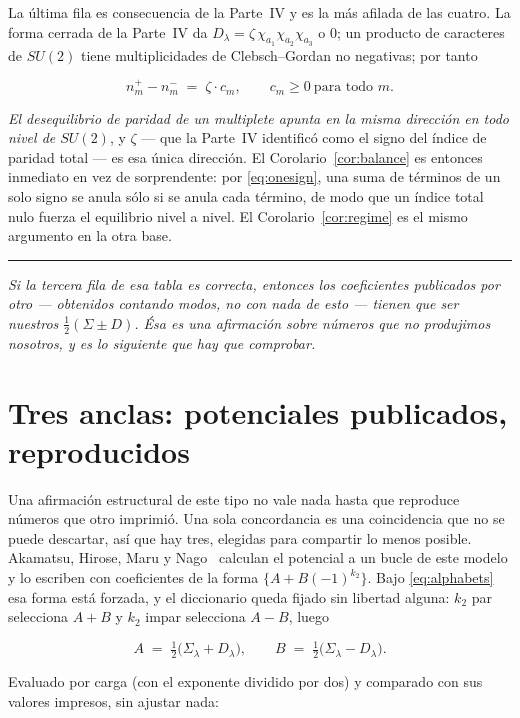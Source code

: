 \documentclass[11pt,a4paper]{article}
\newcommand{\Sig}{\Sigma_\lambda}
\newcommand{\Dl}{D_\lambda}
\newcommand{\bridge}[1]{\par\medskip\noindent
  \textcolor{hdrblue!45}{\rule{2.2cm}{0.6pt}}\;\;\parbox[t]{0.84\textwidth}{\small\itshape
  \textcolor{hdrblue!85}{#1}}\par\medskip}
\newenvironment{keyeq}
  {\begin{center}\setlength{\fboxsep}{9pt}\setlength{\fboxrule}{0.8pt}%
   \begin{lrbox}{\keyeqbox}\begin{minipage}{0.88\textwidth}}
  {\end{minipage}\end{lrbox}%
   \fcolorbox{hdrblue!55}{hdrblue!6}{\usebox{\keyeqbox}}\end{center}}
\begin{document}
La última fila es consecuencia de la Parte~IV y es la más afilada de las cuatro. La forma cerrada de
la Parte~IV da $\Dl=\zeta\,\chi_{a_1}\chi_{a_2}\chi_{a_3}$ o $0$; un producto de caracteres de $SU(2)$
tiene multiplicidades de Clebsch--Gordan no negativas; por tanto

\begin{keyeq}
\begin{equation}\label{eq:onesign}
n^+_m-n^-_m \;=\; \zeta\cdot c_m,\qquad c_m\ge0\ \text{para todo } m .
\end{equation}
\end{keyeq}

\noindent \emph{El desequilibrio de paridad de un multiplete apunta en la misma dirección en todo
nivel de $SU(2)$}, y $\zeta$ --- que la Parte~IV identificó como el signo del índice de paridad total
--- es esa única dirección. El Corolario~\ref{cor:balance} es entonces inmediato en vez de
sorprendente: por \eqref{eq:onesign}, una suma de términos de un solo signo se anula sólo si se anula
cada término, de modo que un índice total nulo fuerza el equilibrio nivel a nivel. El
Corolario~\ref{cor:regime} es el mismo argumento en la otra base.

\bridge{Si la tercera fila de esa tabla es correcta, entonces los coeficientes publicados por otro
--- obtenidos contando modos, no con nada de esto --- tienen que \emph{ser} nuestros
$\tfrac12(\Sigma\pm D)$. Ésa es una afirmación sobre números que no produjimos nosotros, y es lo
siguiente que hay que comprobar.}

\section{Tres anclas: potenciales publicados, reproducidos}\label{sec:anchor}

Una afirmación estructural de este tipo no vale nada hasta que reproduce números que otro imprimió.
Una sola concordancia es una coincidencia que no se puede descartar, así que hay tres, elegidas para
compartir lo menos posible. Akamatsu, Hirose, Maru y Nago~\cite{AHMN} calculan el potencial a un
bucle de este modelo y lo escriben con coeficientes de la forma $\{A+B(-1)^{k_2}\}$. Bajo
\eqref{eq:alphabets} esa forma está forzada, y el diccionario queda fijado sin libertad alguna:
$k_2$ par selecciona $A+B$ y $k_2$ impar selecciona $A-B$, luego
\begin{keyeq}
\begin{equation}\label{eq:dict}
A \;=\; \tfrac12\big(\Sig+\Dl\big), \qquad B \;=\; \tfrac12\big(\Sig-\Dl\big).
\end{equation}
\end{keyeq}
Evaluado por carga (con el exponente dividido por dos) y comparado con sus valores impresos, sin
ajustar nada:
\end{document}
